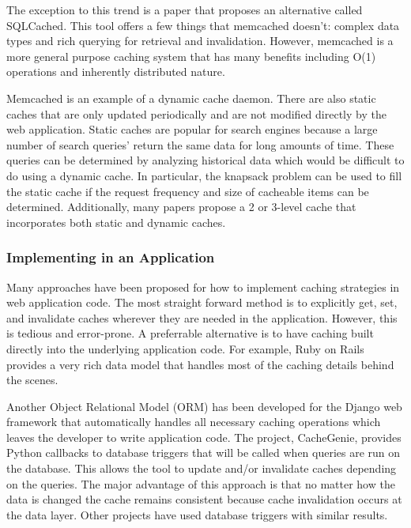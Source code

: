 \documentclass[12pt]{article}
\begin{document}
The exception to this trend is a paper that proposes an alternative called SQLCached.\cite{sqlCached}
This tool offers a few things that memcached doesn't: complex data types and rich querying for retrieval and invalidation.
However, memcached is a more general purpose caching system that has many benefits including O(1) operations and inherently distributed nature.\cite{memcachedDotOrg}

Memcached is an example of a dynamic cache daemon.
There are also static caches that are only updated periodically and are not modified directly by the web application.
Static caches are popular for search engines because a large number of search queries' return the same data for long amounts of time.
These queries can be determined by analyzing historical data which would be difficult to do using a dynamic cache.\cite{designTradeOffsSearchEngine}
In particular, the knapsack problem can be used to fill the static cache if the request frequency and size of cacheable items can be determined.\cite{designTradeOffsSearchEngine}
Additionally, many papers propose a 2 or 3-level cache that incorporates both static and dynamic caches.\cite{cacheAdmissionPolicies}\cite{designTradeOffsSearchEngine}

\subsubsection{Implementing in an Application}
Many approaches have been proposed for how to implement caching strategies in web application code.
The most straight forward method is to explicitly get, set, and invalidate caches wherever they are needed in the application.
However, this is tedious and error-prone.\cite{keyBasedCacheExpiration}\cite{triggerBasedORM}
A preferrable alternative is to have caching built directly into the underlying application code.
For example, Ruby on Rails provides a very rich data model that handles most of the caching details behind the scenes.\cite{keyBasedCacheExpiration}

Another Object Relational Model (ORM) has been developed for the Django web framework that automatically handles all necessary caching operations which leaves the developer to write application code.\cite{triggerBasedORM}
The project, CacheGenie, provides Python callbacks to database triggers that will be called when queries are run on the database. This allows the tool to update and/or invalidate caches depending on the queries.
The major advantage of this approach is that no matter how the data is changed the cache remains consistent because cache invalidation occurs at the data layer.
Other projects have used database triggers with similar results.\cite{scalableConsistentCaching}
\end{document}
